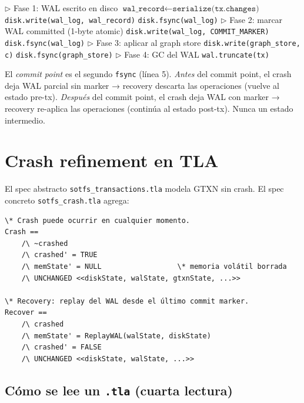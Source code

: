 \begin{algorithm}
\caption{\texttt{gtxn\_commit(tx)} --- WAL + fsync}
\begin{algorithmic}[1]
\State \(\triangleright\) Fase 1: WAL escrito en disco
\State $\texttt{wal\_record} \gets \texttt{serialize(tx.changes)}$
\State \texttt{disk.write(wal\_log, wal\_record)}
\State \texttt{disk.fsync(wal\_log)}
\State \(\triangleright\) Fase 2: marcar WAL committed (1-byte atomic)
\State \texttt{disk.write(wal\_log, COMMIT\_MARKER)}
\State \texttt{disk.fsync(wal\_log)}
\State \(\triangleright\) Fase 3: aplicar al graph store
  \State \texttt{disk.write(graph\_store, c)}
\EndFor
\State \texttt{disk.fsync(graph\_store)}
\State \(\triangleright\) Fase 4: GC del WAL
\State \texttt{wal.truncate(tx)}
\end{algorithmic}
\end{algorithm}

El \emph{commit point} es el segundo \texttt{fsync} (línea 5).
\emph{Antes} del commit point, el crash deja WAL parcial sin
marker → recovery descarta las operaciones (vuelve al estado
pre-tx). \emph{Después} del commit point, el crash deja WAL
con marker → recovery re-aplica las operaciones (continúa al
estado post-tx). Nunca un estado intermedio.

\section{Crash refinement en TLA}

El spec abstracto \texttt{sotfs\_transactions.tla} modela GTXN
sin crash. El spec concreto \texttt{sotfs\_crash.tla} agrega:

\begin{lstlisting}[language=tla, frame=single, basicstyle=\ttfamily\scriptsize]
\* Crash puede ocurrir en cualquier momento.
Crash ==
    /\ ~crashed
    /\ crashed' = TRUE
    /\ memState' = NULL                  \* memoria volátil borrada
    /\ UNCHANGED <<diskState, walState, gtxnState, ...>>

\* Recovery: replay del WAL desde el último commit marker.
Recover ==
    /\ crashed
    /\ memState' = ReplayWAL(walState, diskState)
    /\ crashed' = FALSE
    /\ UNCHANGED <<diskState, walState, ...>>
\end{lstlisting}

\subsection*{Cómo se lee un \texttt{.tla} (cuarta lectura)}


